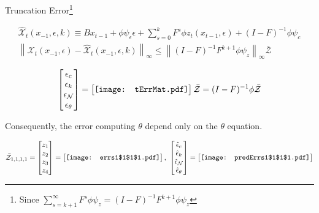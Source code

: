 \documentclass[12pt]{article}
\newcommand{\xWargK}{   \hat{\mathcal{X}}_{t}(x_{-1},\epsilon,k)}
\newcommand{\xWarg}{   \mathcal{X}_{t}(x_{-1},\epsilon)}
\newcommand\infNorm[1]{\left\lVert#1\right\rVert_\infty}
\begin{document}
Truncation Error\footnote{Since
$\sum_{s=k+1}^{\infty} F^s \phi \psi_z = (I -F)^{-1} F^{k+1}\phi \psi_z$}

 	 \begin{gather}
 	 \xWargK \equiv B x_{t-1}+ \phi \psi_\epsilon\epsilon + \sum_{s=0}^k F^s \phi z_{t}(x_{t-1},\epsilon) + (I - F)^{-1} \phi \psi_c \label{theTruncSeries}\\
      \label{eq:1}
\infNorm{\xWarg-\xWargK} \le \infNorm{(I -F)^{-1} F^{k+1}\phi \psi_z} \bar{\mathcal{Z}}
    \end{gather}


\begin{gather*}
\begin{bmatrix}
\epsilon_c\\\epsilon_k\\\epsilon_\mathcal{N}\\\epsilon_\theta
 \end{bmatrix}= \begin{bmatrix}
\vcenter{\hbox{\texttt{[image: tErrMat.pdf]}}}
 \end{bmatrix}\bar{\mathcal{Z}}= (I-F)^{-1} \phi  \bar{\mathcal{Z}}
\end{gather*}

Consequently, the error computing $\theta$ depend only on the $\theta$  equation.  

\begin{gather*}
\bar{\mathcal{Z}}_{1,1,1,1}=\begin{bmatrix}
z_1\\
z_2\\
z_3\\
z_4
 \end{bmatrix}= \begin{bmatrix}
\vcenter{\hbox{\texttt{[image: errs1\$1\$1\$1.pdf]}}}
 \end{bmatrix},\,\, \begin{bmatrix}
\hat{\epsilon}_c\\\hat{\epsilon}_k\\\hat{\epsilon}_\mathcal{N}\\\hat{\epsilon}_\theta
 \end{bmatrix}=\begin{bmatrix}
\vcenter{\hbox{\texttt{[image: predErrs1\$1\$1\$1.pdf]}}}
 \end{bmatrix}
\end{gather*}
\end{document}
